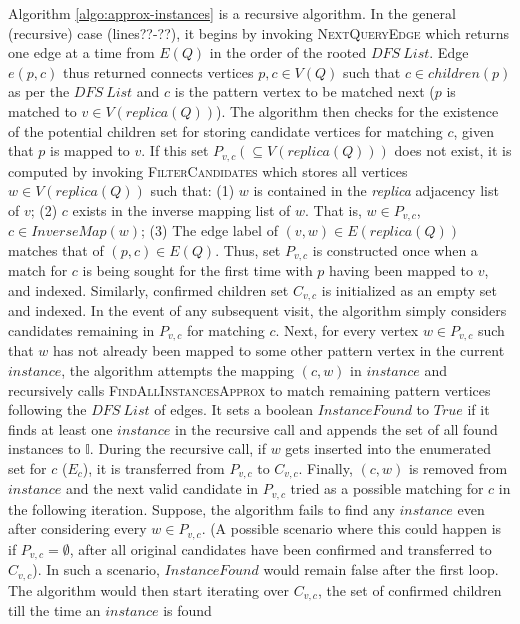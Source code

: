 Algorithm \ref{algo:approx-instances} is a recursive algorithm. In the general
(recursive) case (lines??-??), it begins by invoking \textsc{NextQueryEdge}
which returns one edge at a time from $E(Q)$ in the order of the rooted $DFS\
List$. Edge $e(p,c)$ thus returned connects vertices $p,c \in V(Q)$ such that
$c\in children(p)$ as per the $DFS\ List$ and $c$ is the pattern vertex to be
matched next ($p$ is matched to $v \in V(replica(Q))$). The algorithm then
checks for the existence of the potential children set for storing candidate
vertices for matching $c$, given that $p$ is mapped to $v$. If this set
$P_{v,c}(\subseteq V(replica(Q)))$ does not exist, it is computed by invoking
\textsc{FilterCandidates} which stores all vertices $w\in V(replica(Q))$ such
that: (1) $w$ is contained in the \textit{replica} adjacency list of $v$; (2)
$c$ exists in the inverse mapping list of $w$. That is, \forall $w \in P_{v,c}$,
$c\in InverseMap(w)$; (3) The edge label of $(v,w)\in E(replica(Q))$ matches
that of $(p,c)\in E(Q)$. Thus, set $P_{v,c}$ is constructed once when a match
for $c$ is being sought for the first time with $p$ having been mapped to $v$,
and indexed. Similarly, confirmed children set $C_{v,c}$ is initialized as an
empty set and indexed. In the event of any subsequent visit, the algorithm
simply considers candidates remaining in $P_{v,c}$ for matching $c$. Next, for
every vertex $w \in P_{v,c}$ such that $w$ has not already been mapped to some
other pattern vertex in the current $instance$, the algorithm attempts the
mapping $(c,w)$ in $instance$ and recursively calls
\textsc{FindAllInstancesApprox} to match remaining pattern vertices following
the $DFS\ List$ of edges. It sets a boolean $InstanceFound$ to $True$ if it
finds at least one $instance$ in the recursive call and appends the set of all
found instances to $\mathbb{I}$. During the recursive call, if $w$ gets inserted
into the enumerated set for $c$ ($E_c$), it is transferred from $P_{v,c}$ to
$C_{v,c}$. Finally, $(c,w)$ is removed from $instance$ and the next valid
candidate in $P_{v,c}$ tried as a possible matching for $c$ in the following
iteration. Suppose, the algorithm fails to find any $instance$ even after
considering every $w\in P_{v,c}$. (A possible scenario where this could happen
is if $P_{v,c}=\emptyset$, after all original candidates have been confirmed and
transferred to $C_{v,c}$). In such a scenario, $InstanceFound$ would remain
false after the first loop. The algorithm would then start iterating over
$C_{v,c}$, the set of confirmed children till the time an $instance$ is found
